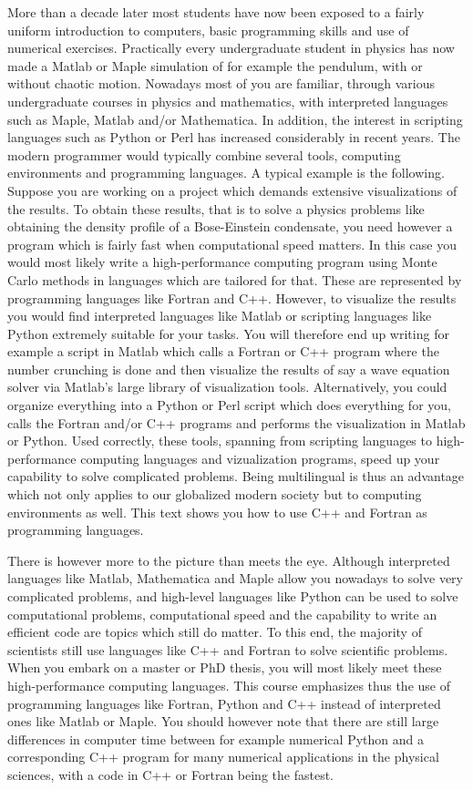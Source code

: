 More than a decade later most students have now been exposed to a
fairly uniform introduction to computers, basic programming skills and
use of numerical exercises.  Practically every undergraduate student
in physics has now made a Matlab or Maple simulation of for example
the pendulum, with or without chaotic motion.  Nowadays most of you
are familiar, through various undergraduate courses in physics and
mathematics, with interpreted languages such as Maple, Matlab and/or
Mathematica. In addition, the interest in scripting languages such as
Python or Perl has increased considerably in recent years.  The modern
programmer would typically combine several tools, computing
environments and programming languages. A typical example is the
following. Suppose you are working on a project which demands
extensive visualizations of the results. To obtain these results, that
is to solve a physics problems like obtaining the density profile of a
Bose-Einstein condensate, you need however a program which is fairly
fast when computational speed matters.  In this case you would most
likely write a high-performance computing program using Monte Carlo
methods in languages which are tailored for that. These are
represented by programming languages like Fortran and C++.  However,
to visualize the results you would find interpreted languages like
Matlab or scripting languages like Python extremely suitable for your
tasks.  You will therefore end up writing for example a script in
Matlab which calls a Fortran or C++ program where the number crunching
is done and then visualize the results of say a wave equation solver
via Matlab's large library of visualization tools. Alternatively, you
could organize everything into a Python or Perl script which does
everything for you, calls the Fortran and/or C++ programs and performs
the visualization in Matlab or Python. Used correctly, these tools,
spanning from scripting languages to high-performance computing
languages and vizualization programs, speed up your capability to
solve complicated problems.  Being multilingual is thus an advantage
which not only applies to our globalized modern society but to
computing environments as well.  This text shows you how to use C++
and Fortran as programming languages.

There is however more to the picture than meets the eye.  Although
interpreted languages like Matlab, Mathematica and Maple allow you
nowadays to solve very complicated problems, and high-level languages
like Python can be used to solve computational problems, computational
speed and the capability to write an efficient code are topics which
still do matter. To this end, the majority of scientists still use
languages like C++ and Fortran to solve scientific problems.  When you
embark on a master or PhD thesis, you will most likely meet these
high-performance computing languages.  This course emphasizes thus the
use of programming languages like Fortran, Python and C++ instead of
interpreted ones like Matlab or Maple. You should however note that
there are still large differences in computer time between for example
numerical Python and a corresponding C++ program for many numerical
applications in the physical sciences, with a code in C++ or Fortran
being the fastest.

